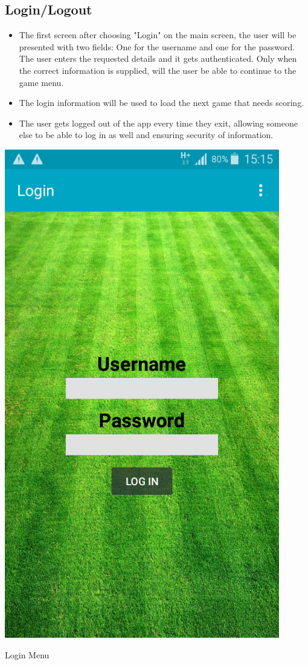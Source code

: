 \documentclass[hidelinks,a4paper,12pt]{article}
\begin{document}
	\subsection{Login/Logout}
		\begin {itemize}
			\item The first screen after choosing "Login" on the main screen, the user will be presented with two fields: One for the username and one for the password. The user enters the requested details and it gets authenticated. Only when the correct information is supplied, will the user be able to continue to the game menu.
			\item The login information will be used to load the next game that needs scoring.
			\item The user gets logged out of the app every time they exit, allowing someone else to be able to log in as well and ensuring security of information.
		\end{itemize}
		
  		\begin{minipage}[b]{0.4\textwidth}
    			\includegraphics[width=0.9\textwidth]{./images/login_menu.png}
    			\caption{Login Menu}
  		\end{minipage}
\end{document}
